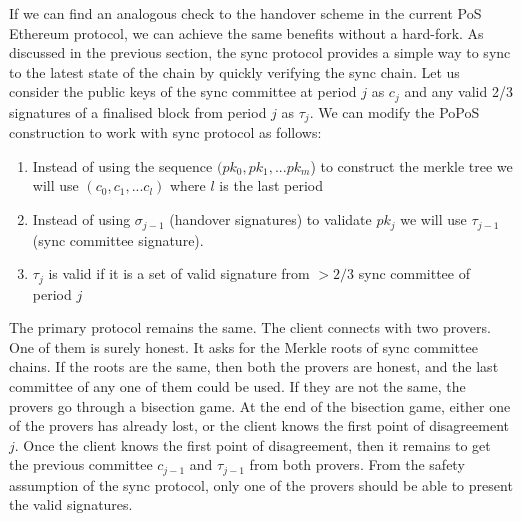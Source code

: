 \documentclass[a4paper,11pt,oneside]{article}
\theoremstyle{definition}
\begin{document}
   If we can find an analogous check to the handover scheme in the current PoS Ethereum protocol, we can achieve the same benefits without a hard-fork. As discussed in the previous section, the sync protocol provides a simple way to sync to the latest state of the chain by quickly verifying the sync chain. Let us consider the public keys of the sync committee at period $j$ as $c_j$ and any valid 2/3 signatures of a finalised block from period $j$ as $\tau_j$. We can modify the PoPoS construction to work with sync protocol as follows:
   \begin{enumerate}
       \item Instead of using the sequence $(pk_0, pk_1, ... pk_m$) to construct the merkle tree we will use $(c_0, c_1, ... c_l)$ where $l$ is the last period
       \item Instead of using $\sigma_{j - 1}$ (handover signatures) to validate $pk_j$ we will use $\tau_{j - 1}$ (sync committee signature).
       \item $\tau_j$ is valid if it is a set of valid signature from $>2/3$ sync committee of period $j$
   \end{enumerate}
   
   The primary protocol remains the same. The client connects with two provers. One of them is surely honest. It asks for the Merkle roots of sync committee chains. If the roots are the same, then both the provers are honest, and the last committee of any one of them could be used. If they are not the same, the provers go through a bisection game. At the end of the bisection game, either one of the provers has already lost, or the client knows the first point of disagreement $j$. Once the client knows the first point of disagreement, then it remains to get the previous committee $c_{j - 1}$ and $\tau_{j - 1}$ from both provers. From the safety assumption of the sync protocol, only one of the provers should be able to present the valid signatures.
   
\end{document}
